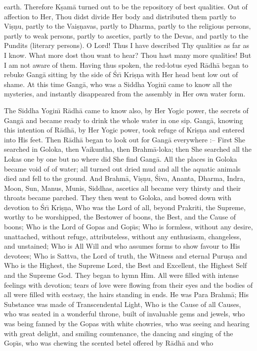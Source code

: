 earth. Therefore K\d{s}am\=a turned out to be the repository of best qualities. Out of affection to Her, Thou didst divide Her body and distributed them partly to Vi\d{s}\d{n}u, partly to the Vai\d{s}\d{n}avas, partly to Dharma, partly to the religious persons, partly to weak persons, partly to ascetics, partly to the Devas, and partly to the Pundits (literary persons). O Lord! Thus I have described Thy qualities as far as I know. What more dost thou want to hear? Thou hast many more qualities! But I am not aware of them. Having thus spoken, the red-lotus eyed R\=adh\=a began to rebuke Gang\=a sitting by the side of \'Sr\={\i} Kri\d{s}\d{n}a with Her head bent low out of shame. At this time Gang\=a, who was a Siddha Yogin\={\i} came to know all the mysteries, and instantly disappeared from the assembly in Her own water form.

The Siddha Yogin\={\i} R\=adh\=a came to know also, by Her Yogic power, the secrets of Gang\=a and became ready to drink the whole water in one sip. Gang\=a, knowing this intention of R\=adh\=a, by Her Yogic power, took refuge of Kri\d{s}\d{n}a and entered into His feet. Then R\=adh\=a began to look out for Gang\=a everywhere :-- First She searched in Goloka, then Vaikuntha, then Brahm\=a-loka; then She searched all the Lokas one by one but no where did She find Gang\=a. All the places in Goloka became void of of water; all turned out dried mud and all the aquatic animals died and fell to the ground. And Brahm\=a, Vi\d{s}\d{n}u, \'Siva, Ananta, Dharma, Indra, Moon, Sun, Manus, Munis, Siddhas, ascetics all became very thirsty and their throats became parched. They then went to Goloka, and bowed down with devotion to \'Sr\={\i} Kri\d{s}\d{n}a, Who was the Lord of all, beyond Prakriti, the Supreme, worthy to be worshipped, the Bestower of boons, the Best, and the Cause of boons; Who is the Lord of Gopas and Gop\={\i}s; Who is formless, without any desire, unattached, without refuge, attributeless, without any enthusiasm, changeless, and unstained; Who is All Will and who assumes forms to show favour to His devotees; Who is Sattva, the Lord of truth, the Witness and eternal Puru\d{s}a and Who is the Highest, the Supreme Lord, the Best and Excellent, the Highest Self and the Supreme God. They began to hymn Him. All were filled with intense feelings with devotion; tears of love were flowing from their eyes and the bodies of all were filled with ecstasy, the hairs standing in ends. He was Para Brahm\=a; His Substance was made of Transcendental Light, Who is the Cause of all Causes, who was seated in a wonderful throne, built of invaluable gems and jewels, who was being fanned by the Gopas with white chowries, who was seeing and hearing with great delight, and smiling countenance, the dancing and singing of the Gop\={\i}s, who was chewing the scented betel offered by R\=adh\=a and who

